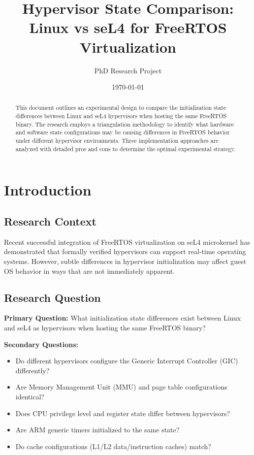 \documentclass[11pt,a4paper]{article}
\title{Hypervisor State Comparison: Linux vs seL4 for FreeRTOS Virtualization}
\author{PhD Research Project}
\date{\today}
\begin{document}
\maketitle

\begin{abstract}
This document outlines an experimental design to compare the initialization state differences between Linux and seL4 hypervisors when hosting the same FreeRTOS binary. The research employs a triangulation methodology to identify what hardware and software state configurations may be causing differences in FreeRTOS behavior under different hypervisor environments. Three implementation approaches are analyzed with detailed pros and cons to determine the optimal experimental strategy.
\end{abstract}

\section{Introduction}

\subsection{Research Context}
Recent successful integration of FreeRTOS virtualization on seL4 microkernel has demonstrated that formally verified hypervisors can support real-time operating systems. However, subtle differences in hypervisor initialization may affect guest OS behavior in ways that are not immediately apparent.

\subsection{Research Question}
\textbf{Primary Question:} What initialization state differences exist between Linux and seL4 as hypervisors when hosting the same FreeRTOS binary?

\textbf{Secondary Questions:}
\begin{itemize}
    \item Do different hypervisors configure the Generic Interrupt Controller (GIC) differently?
    \item Are Memory Management Unit (MMU) and page table configurations identical?
    \item Does CPU privilege level and register state differ between hypervisors?
    \item Are ARM generic timers initialized to the same state?
    \item Do cache configurations (L1/L2 data/instruction caches) match?
\end{itemize}
\end{document}
